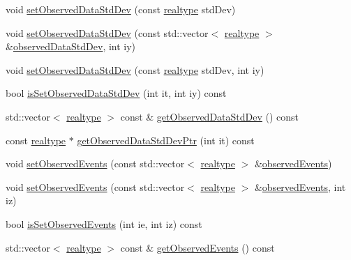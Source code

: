 \begin{DoxyCompactItemize}
\item 
void \mbox{\hyperlink{classamici_1_1_exp_data_ae6ed832b9bee1861d233c90d5a37c677}{set\+Observed\+Data\+Std\+Dev}} (const \mbox{\hyperlink{namespaceamici_a1bdce28051d6a53868f7ccbf5f2c14a3}{realtype}} std\+Dev)
\item 
void \mbox{\hyperlink{classamici_1_1_exp_data_a90948c75e8ce51cd69be08a92215e6c2}{set\+Observed\+Data\+Std\+Dev}} (const std\+::vector$<$ \mbox{\hyperlink{namespaceamici_a1bdce28051d6a53868f7ccbf5f2c14a3}{realtype}} $>$ \&\mbox{\hyperlink{classamici_1_1_exp_data_aa097568cebb4be48c4c1dfaab0c2a159}{observed\+Data\+Std\+Dev}}, int iy)
\item 
void \mbox{\hyperlink{classamici_1_1_exp_data_a10c64e99f5f3a2b19e3944b69b0d69ff}{set\+Observed\+Data\+Std\+Dev}} (const \mbox{\hyperlink{namespaceamici_a1bdce28051d6a53868f7ccbf5f2c14a3}{realtype}} std\+Dev, int iy)
\item 
bool \mbox{\hyperlink{classamici_1_1_exp_data_a75808a32f77afa60bb736a1dfbce9aba}{is\+Set\+Observed\+Data\+Std\+Dev}} (int it, int iy) const
\item 
std\+::vector$<$ \mbox{\hyperlink{namespaceamici_a1bdce28051d6a53868f7ccbf5f2c14a3}{realtype}} $>$ const  \& \mbox{\hyperlink{classamici_1_1_exp_data_ada8a2eebadd4eba1a7c3fa1a014a76d0}{get\+Observed\+Data\+Std\+Dev}} () const
\item 
const \mbox{\hyperlink{namespaceamici_a1bdce28051d6a53868f7ccbf5f2c14a3}{realtype}} $\ast$ \mbox{\hyperlink{classamici_1_1_exp_data_ad0ca0d6d8d5b6bb5587570d70bd3a4fc}{get\+Observed\+Data\+Std\+Dev\+Ptr}} (int it) const
\item 
void \mbox{\hyperlink{classamici_1_1_exp_data_ae621c2d67f85f390d01a97658c956098}{set\+Observed\+Events}} (const std\+::vector$<$ \mbox{\hyperlink{namespaceamici_a1bdce28051d6a53868f7ccbf5f2c14a3}{realtype}} $>$ \&\mbox{\hyperlink{classamici_1_1_exp_data_a629e6085839e16bac95ef0eba580f7f0}{observed\+Events}})
\item 
void \mbox{\hyperlink{classamici_1_1_exp_data_a22ae335c4988600623e7a0c5ca7b47aa}{set\+Observed\+Events}} (const std\+::vector$<$ \mbox{\hyperlink{namespaceamici_a1bdce28051d6a53868f7ccbf5f2c14a3}{realtype}} $>$ \&\mbox{\hyperlink{classamici_1_1_exp_data_a629e6085839e16bac95ef0eba580f7f0}{observed\+Events}}, int iz)
\item 
bool \mbox{\hyperlink{classamici_1_1_exp_data_a7270ea1362212e4dc344e24dc01b70ee}{is\+Set\+Observed\+Events}} (int ie, int iz) const
\item 
std\+::vector$<$ \mbox{\hyperlink{namespaceamici_a1bdce28051d6a53868f7ccbf5f2c14a3}{realtype}} $>$ const  \& \mbox{\hyperlink{classamici_1_1_exp_data_a4f70119553de7d120b14600d7a6d5267}{get\+Observed\+Events}} () const

\end{DoxyCompactItemize}
